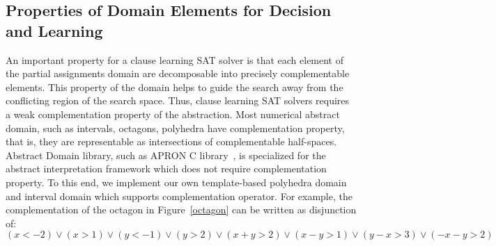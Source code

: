 \subsection{Properties of Domain Elements for Decision and Learning}
%
An important property for a clause learning SAT solver 
is that each element of the partial assignments domain 
are decomposable into precisely complementable 
elements.  This property of the domain helps to 
guide the search away from the conflicting region of the 
search space.  
Thus, clause learning SAT solvers requires a weak complementation property
of the abstraction.  Most numerical abstract domain, such as intervals, 
octagons, polyhedra have complementation property, that is, they are
representable as intersections of complementable half-spaces. 
Abstract Domain library, such as APRON C library~\cite{apron}, 
is specialized for the abstract interpretation framework which 
does not require complementation property.  To this end, we 
implement our own template-based polyhedra domain and interval 
domain which supports complementation operator.  
 For example, the complementation of the octagon in Figure~\ref{octagon} 
can be written as disjunction of:
\[(x<-2) \lor (x>1) \lor (y<-1) \lor (y>2) \lor (x+y>2) \lor (x-y>1) \lor (y-x>3) \lor (-x-y>2)\]

